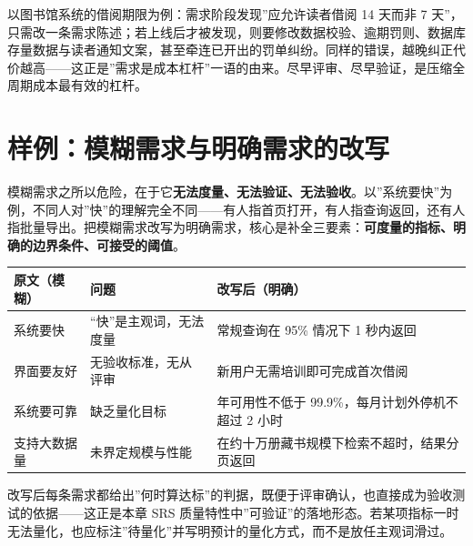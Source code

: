 \documentclass[12pt,a4paper,twoside,openany]{ctexbook}
\numberwithin{figure}{chapter}
\numberwithin{table}{chapter}
\newcounter{none}
\begin{document}
以图书馆系统的借阅期限为例：需求阶段发现''应允许读者借阅 14 天而非 7
天''，只需改一条需求陈述；若上线后才被发现，则要修改数据校验、逾期罚则、数据库存量数据与读者通知文案，甚至牵连已开出的罚单纠纷。同样的错误，越晚纠正代价越高------这正是''需求是成本杠杆''一语的由来。尽早评审、尽早验证，是压缩全周期成本最有效的杠杆。

\section{样例：模糊需求与明确需求的改写}\label{ux6837ux4f8bux6a21ux7ccaux9700ux6c42ux4e0eux660eux786eux9700ux6c42ux7684ux6539ux5199}

模糊需求之所以危险，在于它\textbf{无法度量、无法验证、无法验收}。以''系统要快''为例，不同人对''快''的理解完全不同------有人指首页打开，有人指查询返回，还有人指批量导出。把模糊需求改写为明确需求，核心是补全三要素：\textbf{可度量的指标、明确的边界条件、可接受的阈值}。

{\def\LTcaptype{none} %
\begin{longtable}[]{@{}
  >{\raggedright\arraybackslash}p{}
  >{\raggedright\arraybackslash}p{}
  >{\raggedright\arraybackslash}p{}@{}}
\toprule\noalign{}
\begin{minipage}[b]{\linewidth}\raggedright
原文（模糊）
\end{minipage} & \begin{minipage}[b]{\linewidth}\raggedright
问题
\end{minipage} & \begin{minipage}[b]{\linewidth}\raggedright
改写后（明确）
\end{minipage} \\
\midrule\noalign{}
\endhead
\bottomrule\noalign{}
\endlastfoot
系统要快 & ``快''是主观词，无法度量 & 常规查询在 95\% 情况下 1
秒内返回 \\
界面要友好 & 无验收标准，无从评审 & 新用户无需培训即可完成首次借阅 \\
系统要可靠 & 缺乏量化目标 & 年可用性不低于 99.9\%，每月计划外停机不超过
2 小时 \\
支持大数据量 & 未界定规模与性能 &
在约十万册藏书规模下检索不超时，结果分页返回 \\
\end{longtable}
}

改写后每条需求都给出''何时算达标''的判据，既便于评审确认，也直接成为验收测试的依据------这正是本章
SRS
质量特性中''可验证''的落地形态。若某项指标一时无法量化，也应标注''待量化''并写明预计的量化方式，而不是放任主观词滑过。
\end{document}
